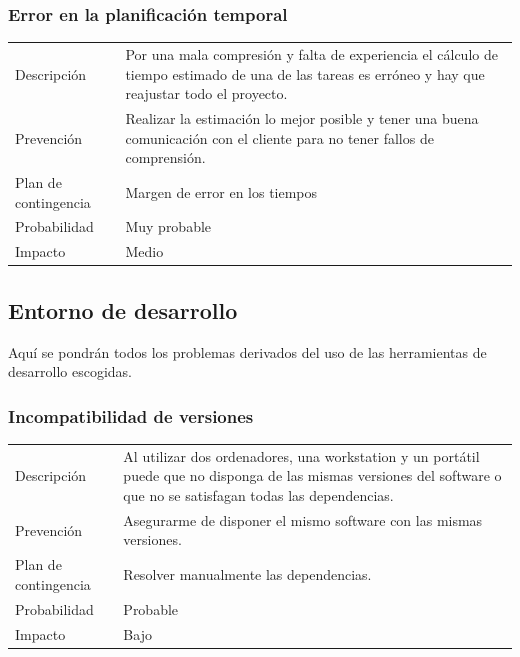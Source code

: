 \subsubsection{Error en la planificaci\'{o}n temporal}
\begin{table}[h]
    \begin{center}
        \begin{tabular}{l p{8cm}}
            Descripci\'{o}n                 & Por una mala compresión y falta de experiencia el cálculo
            de tiempo estimado de una de las tareas es erróneo y hay que reajustar todo el proyecto. \\
            Prevenci\'{o}n                  & Realizar la estimación lo mejor posible y tener una buena
            comunicación con el cliente para no tener fallos de comprensión. \\ 
            Plan de contingencia            & Margen de error en los tiempos \\
            Probabilidad                    & Muy probable \\
            Impacto                         & Medio\\
        \end{tabular}
    \end{center}
    
\end{table}

\subsection{Entorno de desarrollo}
Aqu\'{i} se pondr\'{a}n todos los problemas derivados del uso de las herramientas de desarrollo escogidas.
\subsubsection{Incompatibilidad de versiones}
\begin{table}[h]
    \begin{center}
        \begin{tabular}{l p{8cm}}
            Descripci\'{o}n                 & Al utilizar dos ordenadores, una workstation y un port\'{a}til puede que no disponga de las mismas
            versiones del software o que no se satisfagan todas las dependencias. \\
            Prevenci\'{o}n                  & Asegurarme de disponer el mismo software con las mismas versiones. \\ 
            Plan de contingencia            & Resolver manualmente las dependencias. \\
            Probabilidad                    & Probable \\
            Impacto                         & Bajo\\
        \end{tabular}
    \end{center}
    
\end{table}

